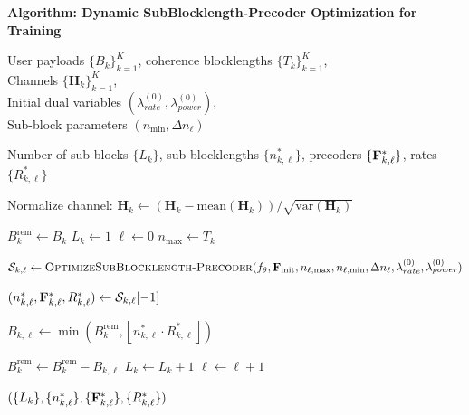 \documentclass[a4paper, 12pt, onecolumn, journal, twoside, draftclsnofoot]{IEEEtran}
\begin{document}
\noindent\textbf{Algorithm: Dynamic SubBlocklength-Precoder Optimization for Training}
\begin{algorithmic}[1]

\Require
User payloads $\{B_k\}_{k=1}^K$, coherence blocklengths $\{T_k\}_{k=1}^K$,\\
Channels $\{\mathbf{H}_k\}_{k=1}^K$,\\
Initial dual variables $(\lambda_{rate}^{(0)}, \lambda_{power}^{(0)})$,\\
Sub-block parameters $(n_{\min}, \Delta n_\ell)$

\Ensure
Number of sub-blocks $\{L_k\}$, sub-blocklengths $\{n_{k,\ell}^*\}$, precoders $\{{\bf F}_{k,\ell}^*\}$, rates $\{R_{k,\ell}^*\}$

 

    \State Normalize channel:
    $\mathbf{H}_k \gets (\mathbf{H}_k - \mathrm{mean}(\mathbf{H}_k)) / \sqrt{\mathrm{var}(\mathbf{H}_k)}$

    \State $B_k^{\mathrm{rem}} \gets B_k$
    \State $L_k \gets 1$
    \State $\ell \gets 0$
    \State $n_{\max} \gets T_k$

        \State
        $\mathcal{S}_{k,\ell}
        \gets
        \textsc{OptimizeSubBlocklength-Precoder}(
        f_\theta,
        {\bf F}_{\mathrm{init}},
        n_{\ell,\max},
        n_{\ell,\min},
        \Delta n_\ell,
        \lambda_{rate}^{(0)},
        \lambda_{power}^{(0)})$

        \State
        $(n_{k,\ell}^*, {\bf F}_{k,\ell}^*, R_{k,\ell}^*)
        \gets \mathcal{S}_{k,\ell}[-1]$ 
        

        \State
        $B_{k,\ell}
        \gets
        \min\!\left(
			B_k^{\mathrm{rem}},
			\left\lfloor n_{k,\ell}^* \cdot R_{k,\ell}^* \right\rfloor
			\right)$
			
        \State $B_k^{\mathrm{rem}} \gets B_k^{\mathrm{rem}} - B_{k,\ell}$
			\State $L_k \gets L_k + 1$
			\State $\ell \gets \ell + 1$
		\EndIf
    \EndWhile

\EndFor

\State \Return
$(\{L_k\}, \{n_{k,\ell}^*\}, \{{\bf F}_{k,\ell}^*\}, \{R_{k,\ell}^*\})$

\end{algorithmic}

\newpage
\end{document}
